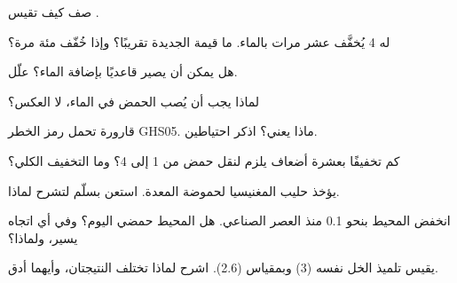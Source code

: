 \begin{exercise}[$\star$]\label{exo:g9:acids-bases-ph:4}
صف كيف تقيس   .
\end{exercise}

\begin{exercise}[$\star\star$]\label{exo:g9:acids-bases-ph:5}
  له 4 يُخفَّف عشر مرات بالماء. ما قيمة  الجديدة تقريبًا؟
وإذا خُفّف مئة مرة؟
\end{exercise}

\begin{exercise}[$\star\star$]\label{exo:g9:acids-bases-ph:6}
هل يمكن أن يصير  قاعديًا بإضافة الماء؟ علّل.
\end{exercise}

\begin{exercise}[$\star\star$]\label{exo:g9:acids-bases-ph:7}
لماذا يجب أن يُصب الحمض في الماء، لا العكس؟
\end{exercise}

\begin{exercise}[$\star\star$]\label{exo:g9:acids-bases-ph:8}
قارورة تحمل رمز الخطر GHS05. ماذا يعني؟ اذكر
احتياطين.
\end{exercise}

\begin{exercise}[$\star\star$]\label{exo:g9:acids-bases-ph:9}
كم تخفيفًا بعشرة أضعاف يلزم لنقل حمض من  1 إلى
 4؟ وما التخفيف الكلي؟
\end{exercise}

\begin{exercise}[$\star\star$]\label{exo:g9:acids-bases-ph:10}
يؤخذ حليب المغنيسيا لحموضة المعدة. استعن بسلّم 
لتشرح لماذا.
\end{exercise}

\begin{exercise}[$\star\star\star$]\label{exo:g9:acids-bases-ph:11}
انخفض  المحيط بنحو 0.1 منذ العصر الصناعي. هل المحيط حمضي اليوم؟ وفي أي
اتجاه يسير، ولماذا؟
\end{exercise}

\begin{exercise}[$\star\star\star$]\label{exo:g9:acids-bases-ph:12}
يقيس تلميذ  الخل نفسه  (3) وبمقياس  (2.6). اشرح لماذا تختلف
النتيجتان، وأيهما أدق.
\end{exercise}

